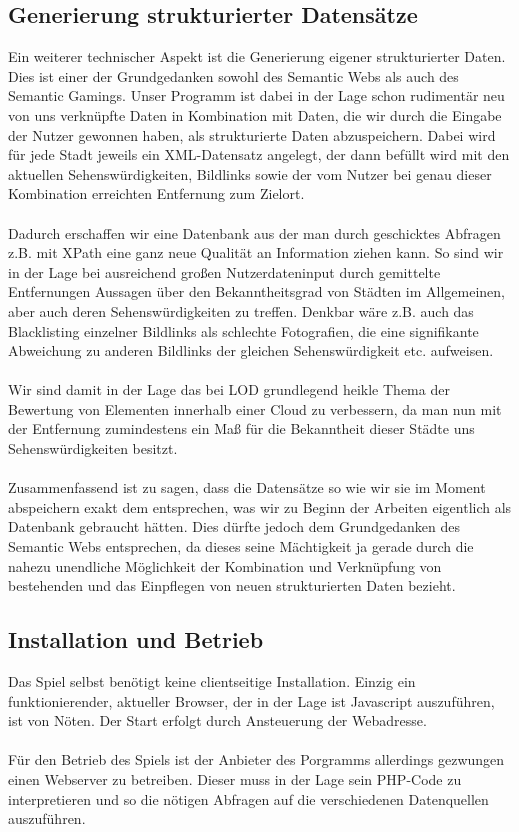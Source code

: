 \documentclass[a4paper, 11pt]{article}
\begin{document}
\subsection{Generierung strukturierter Datensätze}
Ein weiterer technischer Aspekt ist die Generierung eigener strukturierter Daten. Dies ist einer der Grundgedanken sowohl des Semantic Webs als auch des Semantic Gamings. Unser Programm ist dabei in der Lage schon rudimentär neu von uns verknüpfte Daten in Kombination mit Daten, die wir durch die Eingabe der Nutzer gewonnen haben, als strukturierte Daten abzuspeichern. Dabei wird für jede Stadt jeweils ein XML-Datensatz angelegt, der dann befüllt wird mit den aktuellen Sehenswürdigkeiten, Bildlinks sowie der vom Nutzer bei genau dieser Kombination erreichten Entfernung zum Zielort.\\\\ Dadurch erschaffen wir eine Datenbank aus der man durch geschicktes Abfragen z.B. mit XPath eine ganz neue Qualität an Information ziehen kann. So sind wir in der Lage bei ausreichend großen Nutzerdateninput durch gemittelte Entfernungen Aussagen über den Bekanntheitsgrad von Städten im Allgemeinen, aber auch deren Sehenswürdigkeiten zu treffen. Denkbar wäre z.B. auch das Blacklisting einzelner Bildlinks als schlechte Fotografien, die eine signifikante Abweichung zu anderen Bildlinks der gleichen Sehenswürdigkeit etc. aufweisen.\\\\
Wir sind damit in der Lage das bei LOD grundlegend heikle Thema der Bewertung von Elementen innerhalb einer Cloud zu verbessern, da man nun mit der Entfernung zumindestens ein Maß für die Bekanntheit dieser Städte uns Sehenswürdigkeiten besitzt.\\\\
Zusammenfassend ist zu sagen, dass die Datensätze so wie wir sie im Moment abspeichern exakt dem entsprechen, was wir zu Beginn der Arbeiten eigentlich als Datenbank gebraucht hätten. Dies dürfte jedoch dem Grundgedanken des Semantic Webs entsprechen, da dieses seine Mächtigkeit ja gerade durch die nahezu unendliche Möglichkeit der Kombination und Verknüpfung von bestehenden und das Einpflegen von neuen strukturierten Daten bezieht.
\subsection{Installation und Betrieb}
Das Spiel selbst benötigt keine clientseitige Installation. Einzig ein funktionierender, aktueller Browser, der in der Lage ist Javascript auszuführen, ist von Nöten. Der Start erfolgt durch Ansteuerung der Webadresse.\\\\
Für den Betrieb des Spiels ist der Anbieter des Porgramms allerdings gezwungen einen Webserver zu betreiben. Dieser muss in der Lage sein PHP-Code zu interpretieren und so die nötigen Abfragen auf die verschiedenen Datenquellen auszuführen.
\newpage
\end{document}
